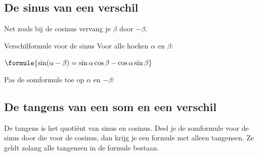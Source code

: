 \begin{oefeningen}
\end{oefeningen}

\subsection{De sinus van een verschil}

Net zoals bij de cosinus vervang je $\beta$ door $-\beta$.

\begin{theorie}
\begin{stelling}{Verschilformule voor de sinus}
Voor alle hoeken $\alpha$ en $\beta$:

\vspace{1mm}
\qquad $\formule{\sin(\alpha - \beta) = \sin\alpha\cos\beta - \cos\alpha\sin\beta}$
\end{stelling}
\begin{bewijs}
Pas de somformule toe op $\alpha$ en $-\beta$:
\end{bewijs}
\end{theorie}


\begin{oefeningen}
\end{oefeningen}

\subsection{De tangens van een som en een verschil}

De tangens is het quotiënt van sinus en cosinus. Deel je de somformule voor de sinus door die voor de cosinus, dan krijg je een formule met alleen tangensen. Ze geldt zolang alle tangensen in de formule bestaan.

